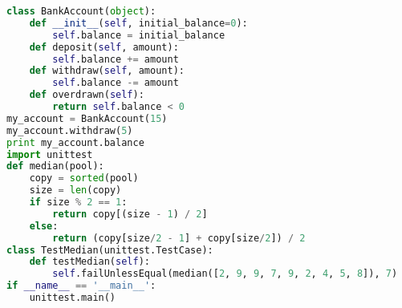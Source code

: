\begin{lstlisting}[language=python,caption={Python 代码示例},label=Python]
class BankAccount(object):
    def __init__(self, initial_balance=0):
        self.balance = initial_balance
    def deposit(self, amount):
        self.balance += amount
    def withdraw(self, amount):
        self.balance -= amount
    def overdrawn(self):
        return self.balance < 0
my_account = BankAccount(15)
my_account.withdraw(5)
print my_account.balance
import unittest
def median(pool):
    copy = sorted(pool)
    size = len(copy)
    if size % 2 == 1:
        return copy[(size - 1) / 2]
    else:
        return (copy[size/2 - 1] + copy[size/2]) / 2
class TestMedian(unittest.TestCase):
    def testMedian(self):
        self.failUnlessEqual(median([2, 9, 9, 7, 9, 2, 4, 5, 8]), 7)
if __name__ == '__main__':
    unittest.main()
\end{lstlisting}




